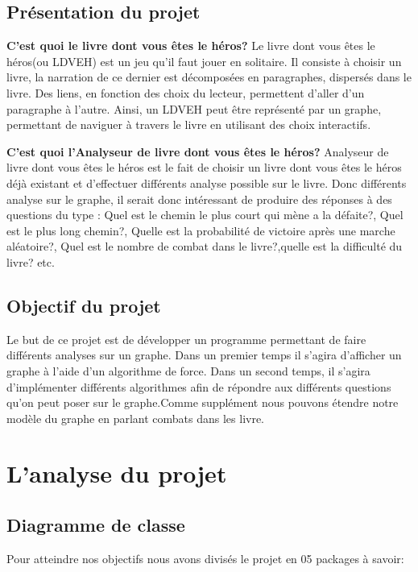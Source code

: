 \documentclass[12pt]{article}
\begin{document}
\subsection{Présentation du projet}

\textbf{C'est quoi le livre dont vous êtes le héros?}
\newline
\newline
   Le livre dont vous êtes le héros(ou LDVEH) est un jeu qu'il faut jouer en solitaire. Il consiste à choisir un livre, la narration de ce dernier est décomposées en paragraphes, dispersés dans le livre. Des liens, en fonction des choix du lecteur, permettent d’aller d’un paragraphe à l’autre. Ainsi, un LDVEH peut être représenté par un graphe, permettant de naviguer à travers le livre en utilisant des choix interactifs.

\textbf{C'est quoi l'Analyseur de livre dont vous êtes le héros?}
\newline
\newline
  Analyseur de livre dont vous êtes le héros est le fait de choisir un livre dont vous êtes le héros déjà existant et d'effectuer différents analyse possible sur le livre. Donc différents analyse sur le graphe, il serait donc intéressant de produire des réponses à des questions du type :  Quel est le chemin le plus court qui mène a la défaite?, Quel est le plus long chemin?, Quelle est la probabilité de victoire après une marche aléatoire?, Quel est le nombre de combat dans le livre?,quelle est la difficulté du livre? etc.
  
\subsection{Objectif du projet}

  Le but de ce projet est de développer un programme permettant de faire différents analyses sur un graphe. Dans un premier temps il s'agira d'afficher un graphe à l'aide d'un algorithme de force. Dans un second temps, il s'agira d’implémenter différents algorithmes afin de répondre aux différents questions qu'on peut poser sur le graphe.Comme supplément nous pouvons étendre notre modèle du graphe en parlant combats dans les livre. 

\section{L'analyse du projet}

\subsection{Diagramme de classe}
  Pour atteindre nos objectifs nous avons divisés le projet en 05 packages à savoir:
  
\end{document}
